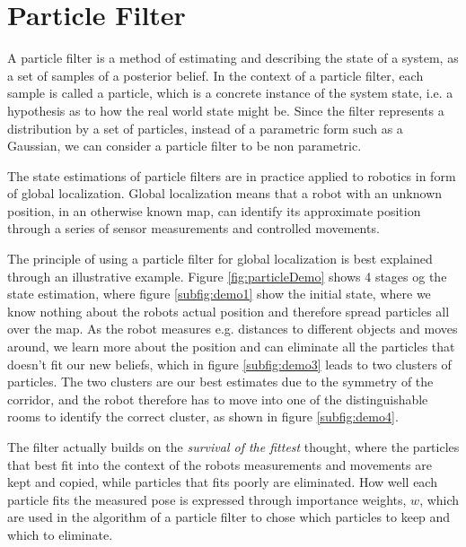 \chapter{Particle Filter}
\label{chp:partFilter}
A particle filter is a method of estimating and describing the state of a system, as a set of samples of a posterior belief.
In the context of a particle filter, each sample is called a particle, which is a concrete instance of the system state, i.e. a hypothesis as to how the real world state might be.
Since the filter represents a distribution by a set of particles, instead of a parametric form such as a Gaussian, we can consider a particle filter to be non parametric.






The state estimations of particle filters are in practice applied to robotics in form of global localization.
Global localization means that a robot with an unknown position, in an otherwise known map, can identify its approximate position through a series of sensor measurements and controlled movements.

The principle of using a particle filter for global localization is best explained through an illustrative example. 
Figure \ref{fig:particleDemo} shows 4 stages og the state estimation, where figure \ref{subfig:demo1} show the initial state, where we know nothing about the robots actual position and therefore spread particles all over the map.
As the robot measures e.g. distances to different objects and moves around, we learn more about the position and can eliminate all the particles that doesn't fit our new beliefs, which in figure \ref{subfig:demo3} leads to two clusters of particles.
The two clusters are our best estimates due to the symmetry of the corridor, and the robot therefore has to move into one of the distinguishable rooms to identify the correct cluster, as shown in figure \ref{subfig:demo4}.

The filter actually builds on the \emph{survival of the fittest} thought, where the particles that best fit into the context of the robots measurements and movements are kept and copied, while particles that fits poorly are eliminated.
How well each particle fits the measured pose is expressed through importance weights, $w$, which are used in the algorithm of a particle filter to chose which particles to keep and which to eliminate.

